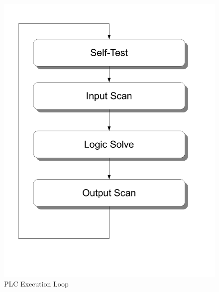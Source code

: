 
\begin{figure}[htp]
    \centering
    \includegraphics[width=\imgmedphoto]{./images/plcexecution.pdf}
    \caption{PLC Execution Loop}
    \label{fig:plcexecution}
\end{figure}

